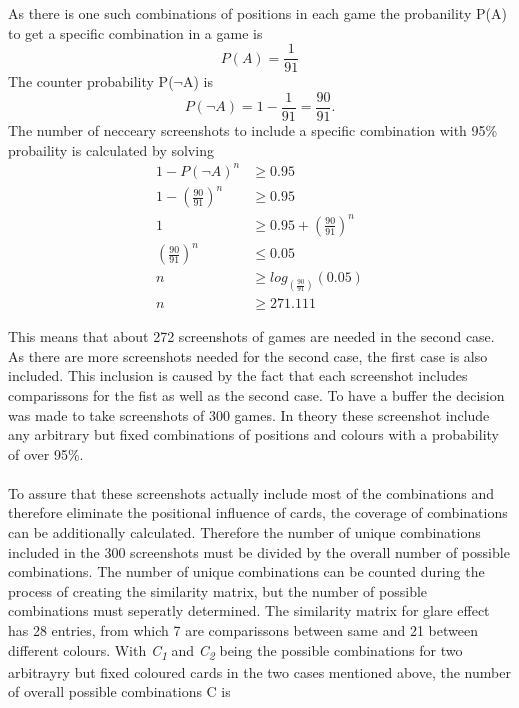 \begin{center}
	As there is one such combinations of positions in each game the probanility P(A) to get a specific combination in a game is 
	\begin{equation*}
	P(A) = \frac{1}{91} %
	\end{equation*}
	The counter probability P($\lnot$A) is 
	\begin{equation*}
	P(\lnot A) = 1 - \frac{1}{91} = \frac{90}{91}.%
	\end{equation*}
	The number of necceary screenshots to include a specific combination with 95\% probaility is calculated by solving
	\begin{align*}
	1 - P(\lnot A)^n &\geq 0.95 \\
	1 - \left(\frac{90}{91}\right)^n &\geq 0.95 \\
	1 &\geq 0.95 + \left(\frac{90}{91}\right)^n\\
	\left(\frac{90}{91}\right)^n &\leq 0.05\\
	n &\geq log_{(\frac{90}{91})}(0.05) \\
	n &\geq 271.111 %
	\end{align*}
\end{center}
This means that about 272 screenshots of games are needed in the second case. As there are more screenshots needed for the second case, the first case is also included. This inclusion is caused by the fact that each screenshot includes comparissons for the  fist  as well as the second case. To have a buffer the decision was made to take screenshots of 300 games. In theory these screenshot include any arbitrary but fixed combinations of positions and colours with a probability of over 95\%.\\\\
To assure that these screenshots actually include most of the combinations and therefore eliminate the positional influence of cards, the coverage of combinations can be additionally calculated. Therefore the number of unique combinations included in the 300 screenshots must be divided by the overall number of possible combinations. The number of unique combinations can be counted during the process of creating the similarity matrix, but the number of possible combinations must seperatly determined. The similarity matrix for glare effect has 28 entries, from which 7 are comparissons between same and 21 between different colours. With \textit{C\textsubscript{1}} and \textit{C\textsubscript{2}}  being the possible combinations for two arbitrayry but fixed coloured cards in the two cases mentioned above, the number of overall possible combinations C is
